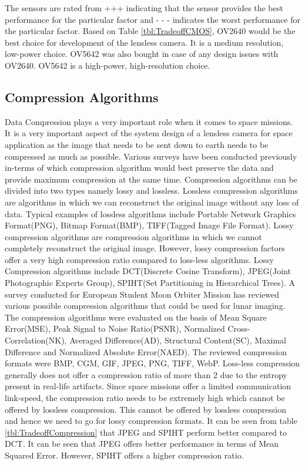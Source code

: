 The sensors are rated from +++ indicating that the sensor provides the best performance for the particular factor and - - - indicates the worst performance for the particular factor. Based on Table \ref{tbl:TradeoffCMOS}, OV2640 would be the best choice for development of the lensless camera. It is a medium resolution, low-power choice. OV5642 was also bought in case of any design issues with OV2640. OV5642 is a high-power, high-resolution choice. 

\subsection{Compression Algorithms}
Data Compression plays a very important role when it comes to space missions. It is a very important aspect of the system design of a lensless camera for space application as the image that needs to be sent down to earth needs to be compressed as much as possible. Various surveys\cite{Compression2}\cite{Compression3}\cite{Compression4} have been conducted previously in-terms of which compression algorithm would best preserve the data and provide maximum compression at the same time. Compression algorithms can be divided into two types namely lossy and lossless. Lossless compression algorithms are algorithms in which we can reconstruct the original image without any loss of data. Typical examples of lossless algorithms include Portable Network Graphics Format(PNG), Bitmap Format(BMP), TIFF(Tagged Image File Format). Lossy compression algorithms are compression algorithms in which we cannot completely reconstruct the original image. However, lossy compression factors offer a very high compression ratio compared to loss-less algorithms. Lossy Compression algorithms include DCT(Discrete Cosine Transform), JPEG(Joint Photographic Experts Group), SPIHT(Set Partitioning in Hierarchical Trees)\cite{Compression3}. A survey conducted for European Student Moon Orbiter Mission\cite{Compression3} has reviewed various possible compression algorithms that could be used for lunar imaging. The compression algorithms were evaluated on the basis of Mean Square Error(MSE), Peak Signal to Noise Ratio(PSNR), Normalized Cross-Correlation(NK), Averaged Difference(AD), Structural Content(SC), Maximal Difference and Normalized Absolute Error(NAED). The reviewed compression formats were BMP, CGM, GIF, JPEG, PNG, TIFF, WebP. Loss-less compression generally does not offer a compression ratio of more than 2 due to the entropy present in real-life artifacts. Since space missions offer a limited communication link-speed, the compression ratio needs to be extremely high which cannot be offered by lossless compression. This cannot be offered by lossless compression and hence we need to go for lossy compression formats. It can be seen from table \ref{tbl:TradeoffCompression} that JPEG and SPIHT perform better compared to DCT. It can be seen that JPEG offers better performance in terms of Mean Squared Error. However, SPIHT offers a higher compression ratio. 

